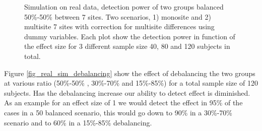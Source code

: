 \documentclass[authoryear]{elsarticle}
\begin{document}
\begin{figure}[H!]
\centering
\captionsetup[subfloat]{labelformat=empty}
\hspace{1mm}
\hspace{1mm}
\hspace{1mm}
\tiny Simulation on real data, detection power of two groups balanced 50\%-50\% between 7 sites. Two scenarios, 1) monosite and 2) multisite 7 sites with correction for multisite differences using dummy variables. Each plot show the detection power in function of the effect size for 3 different sample size 40, 80 and 120 subjects in total.
\label{fig_real_sim_samplesize}
\end{figure}

Figure \ref{fig_real_sim_debalancing} show the effect of debalancing the two groups at various ratio (50\%-50\% , 30\%-70\% and 15\%-85\%) for a total sample size of 120 subjects. Has the debalancing increase our ability to detect effect is diminished. As an example for an effect size of 1 we would detect the effect in 95\% of the cases in a 50 balanced scenario, this would go down to 90\% in a 30\%-70\% scenario and to 60\% in a 15\%-85\% debalancing. 
\end{document}
